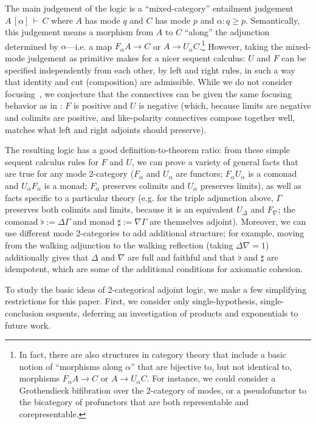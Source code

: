 \documentclass{drl-common/llncs}
\newcommand\seq[3]{\ensuremath{#1 \, [ #2 ] \, \vdash \, #3}}
\begin{document}
The main judgement of the logic is a ``mixed-category'' entailment
judgement \seq{A}{\alpha}{C} where $A$ has mode $q$ and $C$ has mode $p$
and $\alpha : q \ge p$.  Semantically, this judgement means a morphism
from $A$ to $C$ ``along'' the adjunction determined by $\alpha$---i.e. a
map $F_\alpha A \to C$ or $A \to U_\alpha C$.\footnote{In fact, there
  are also structures in category theory that include a basic notion of
  ``morphisms along $\alpha$'' that are bijective to, but not identical
  to, morphisms $F_\alpha A \to C$ or $A \to U_\alpha C$.  For instance,
  we could consider a Grothendieck bifibration over the 2-category of
  modes, or a pseudofunctor to the bicategory of profunctors that are
  both representable and corepresentable.}  However, taking the
mixed-mode judgement as primitive makes for a nicer sequent calculus:
$U$ and $F$ can be specified independently from each other, by left and
right rules, in such a way that identity and cut (composition) are
admissible.  While we do not consider focusing~\citep{andreoli92focus},
we conjecture that the connectives can be given the same focusing
behavior as in \citep{reed09adjoint}: $F$ is positive and $U$ is
negative (which, because limits are negative and colimits are positive,
and like-polarity connectives compose together well, matches what left
and right adjoints should preserve).

The resulting logic has a good definition-to-theorem ratio: from these
simple sequent calculus rules for $F$ and $U$, we can prove a variety of
general facts that are true for any mode 2-category ($F_\alpha$ and
$U_\alpha$ are functors; $F_\alpha U_\alpha$ is a comonad and $U_\alpha
F_\alpha$ is a monad; $F_\alpha$ preserves colimits and $U_\alpha$
preserves limits), as well as facts specific to a particular theory
(e.g. for the triple adjunction above, $\Gamma$ preserves both colimits
and limits, because it is an equivalent $U_\Delta$ and $F_\nabla$; the
comonad $\flat := \Delta\Gamma$ and monad $\sharp := \nabla\Gamma$ are
themselves adjoint).  Moreover, we can use different mode 2-categories
to add additional structure; for example, moving from the walking
adjunction to the walking reflection (taking $\Delta \nabla = 1$)
additionally gives that $\Delta$ and $\nabla$ are full and faithful and
that $\flat$ and $\sharp$ are idempotent, which are some of the
additional conditions for axiomatic cohesion.

To study the basic ideas of 2-categorical adjoint logic, we make a few
simplifying restrictions for this paper. First, we consider only
single-hypothesis, single-conclusion sequents, deferring an investigation
of products and exponentials to future work.  
\end{document}
